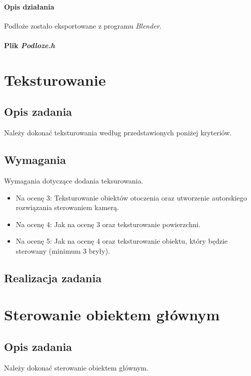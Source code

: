 \documentclass[a4paper, 12pt]{report}
\begin{document}
\subsubsection{Opis działania}

Podłoże zostało eksportowane z programu \emph{Blender}.

\subsubsection{Plik \emph{Podloze.h}}



\chapter{Teksturowanie}
\section{Opis zadania}

Należy dokonać teksturowania według przedstawionych poniżej kryteriów.
\section{Wymagania}

Wymagania dotyczące dodania teksurowania.
\begin{itemize}
\item Na ocenę 3: Teksturowanie obiektów otoczenia oraz utworzenie autorskiego rozwiązania sterowaniem kamerą.
\item Na ocenę 4: Jak na ocenę 3 oraz teksturowanie powierzchni.
\item Na ocenę 5: Jak na ocenę 4 oraz teksturowanie obiektu, który będzie sterowany (minimum 3 bryły).
\end{itemize}
\section{Realizacja zadania}



\chapter{Sterowanie obiektem głównym}
\section{Opis zadania}
Należy dokonać sterowanie obiektem głównym.
\end{document}
